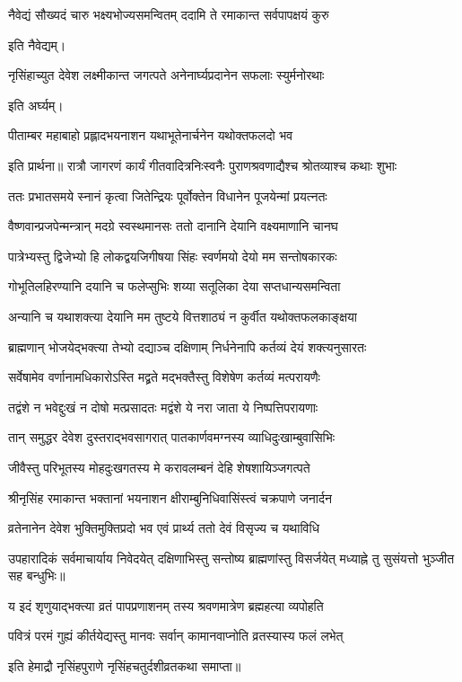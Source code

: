 \twolineshloka
{नैवेद्यं सौख्यदं चारु भक्ष्यभोज्यसमन्वितम्}
{ददामि ते रमाकान्त सर्वपापक्षयं कुरु} %

इति नैवेद्यम्।

\twolineshloka
{नृसिंहाच्युत देवेश लक्ष्मीकान्त जगत्पते}
{अनेनार्घ्यप्रदानेन सफलाः स्युर्मनोरथाः} %

इति अर्घ्यम्।

\twolineshloka
{पीताम्बर महाबाहो प्रह्लादभयनाशन}
{यथाभूतेनार्चनेन यथोक्तफलदो भव} %

इति प्रार्थना॥
\twolineshloka
{रात्रौ जागरणं कार्यं गीतवादित्रनिःस्वनैः}
{पुराणश्रवणाद्यैश्च श्रोतव्याश्च कथाः शुभाः} %

\twolineshloka
{ततः प्रभातसमये स्नानं कृत्वा जितेन्द्रियः}
{पूर्वोक्तेन विधानेन पूजयेन्मां प्रयत्नतः} %

\twolineshloka
{वैष्णवान्प्रजपेन्मन्त्रान् मदग्रे स्वस्थमानसः}
{ततो दानानि देयानि वक्ष्यमाणानि चानघ} %

\twolineshloka
{पात्रेभ्यस्तु द्विजेभ्यो हि लोकद्वयजिगीषया}
{सिंहः स्वर्णमयो देयो मम सन्तोषकारकः} %

\twolineshloka
{गोभूतिलहिरण्यानि दयानि च फलेप्सुभिः}
{शय्या सतूलिका देया सप्तधान्यसमन्विता} %

\twolineshloka
{अन्यानि च यथाशक्त्या देयानि मम तुष्टये}
{वित्तशाठ्यं न कुर्वीत यथोक्तफलकाङ्क्षया} %

\twolineshloka
{ब्राह्मणान् भोजयेद्भक्त्या तेभ्यो दद्याञ्च दक्षिणाम्}
{निर्धनेनापि कर्तव्यं देयं शक्त्यनुसारतः} %


\twolineshloka
{सर्वेषामेव वर्णानामधिकारोऽस्ति मद्व्रते}
{मद्भक्तैस्तु विशेषेण कर्तव्यं मत्परायणैः} %


\twolineshloka
{तद्वंशे न भवेद्दुःखं न दोषो मत्प्रसादतः}
{मद्वंशे ये नरा जाता ये निष्पत्तिपरायणाः} %


\twolineshloka
{तान् समुद्धर देवेश दुस्तराद्भवसागरात्}
{पातकार्णवमग्नस्य व्याधिदुःखाम्बुवासिभिः} %


\twolineshloka
{जीवैस्तु परिभूतस्य मोहदुःखगतस्य मे}
{करावलम्बनं देहि शेषशायिञ्जगत्पते} %


\twolineshloka
{श्रीनृसिंह रमाकान्त भक्तानां भयनाशन}
{क्षीराम्बुनिधिवासिंस्त्वं चक्रपाणे जनार्दन} %


\twolineshloka
{व्रतेनानेन देवेश भुक्तिमुक्तिप्रदो भव}
{एवं प्रार्थ्य ततो देवं विसृज्य च यथाविधि} %

\threelineshloka
{उपहारादिकं सर्वमाचार्याय निवेदयेत्}
{दक्षिणाभिस्तु सन्तोष्य ब्राह्मणांस्तु विसर्जयेत्} %
{मध्याह्ने तु सुसंयत्तो भुञ्जीत सह बन्धुभिः॥}

\twolineshloka
{य इदं शृणुयाद्भक्त्या व्रतं पापप्रणाशनम्}
{तस्य श्रवणमात्रेण ब्रह्महत्या व्यपोहति} %

\twolineshloka
{पवित्रं परमं गुह्यं कीर्तयेद्यस्तु मानवः}
{सर्वान् कामानवाप्नोति व्रतस्यास्य फलं लभेत्}

इति हेमाद्रौ नृसिंहपुराणे नृसिंहचतुर्दशीव्रतकथा समाप्ता॥
